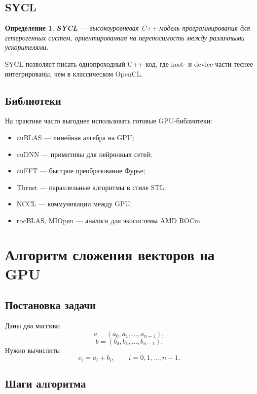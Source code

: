 \documentclass[12pt,a4paper]{article}
\newtheorem{definition}{Определение}
\begin{document}
\subsection{SYCL}

\begin{definition}
\textbf{SYCL} --- высокоуровневая C++-модель программирования для гетерогенных систем, ориентированная на переносимость между различными ускорителями.
\end{definition}

SYCL позволяет писать однопроходный C++-код, где host- и device-части теснее интегрированы, чем в классическом OpenCL.

\subsection{Библиотеки}

На практике часто выгоднее использовать готовые GPU-библиотеки:

\begin{itemize}
    \item cuBLAS --- линейная алгебра на GPU;
    \item cuDNN --- примитивы для нейронных сетей;
    \item cuFFT --- быстрое преобразование Фурье;
    \item Thrust --- параллельные алгоритмы в стиле STL;
    \item NCCL --- коммуникации между GPU;
    \item rocBLAS, MIOpen --- аналоги для экосистемы AMD ROCm.
\end{itemize}

\section{Алгоритм сложения векторов на GPU}

\subsection{Постановка задачи}

Даны два массива:
\[
    a = (a_0,a_1,\dots,a_{n-1}),
\]
\[
    b = (b_0,b_1,\dots,b_{n-1}).
\]
Нужно вычислить:
\[
    c_i = a_i + b_i,\qquad i = 0,1,\dots,n-1.
\]

\subsection{Шаги алгоритма}
\end{document}
